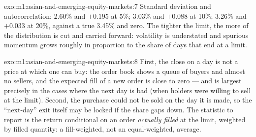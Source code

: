 \begin{solution}{exo:m1:asian-and-emerging-equity-markets:7}
Standard deviation and autocorrelation: 2.60\% and $+0.195$ at 5\%; 3.03\%
and $+0.088$ at 10\%; 3.26\% and $+0.033$ at 20\%, against a true 3.45\% and
zero. The tighter the limit, the more of the distribution is cut and carried
forward: volatility is understated and spurious momentum grows roughly in
proportion to the share of days that end at a limit.
\end{solution}

\begin{solution}{exo:m1:asian-and-emerging-equity-markets:8}
First, the close on a  day is not a price at which one can buy: the
order book shows a queue of buyers and almost no sellers, and the expected
fill of a new order is close to zero --- and is largest precisely in the
cases where the next day is bad (when holders were willing to sell at the
limit). Second, the purchase could not be sold on the day it is made, so the
``next-day'' exit itself may be locked if the share gaps down. The statistic
to report is the return conditional on an order \emph{actually filled} at the
limit, weighted by filled quantity: a fill-weighted, not an equal-weighted,
average.
\end{solution}

